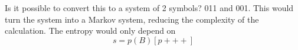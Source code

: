 \documentclass[a4paper, 12pt]{article}
\begin{document}
Is it possible to convert this to a system of 2 symbols? 011 and 001. This would turn the system into a Markov system, reducing the complexity of the calculation. The entropy would only depend on
\begin{equation}
    s = p(B) \left[ p+++ \right]
\end{equation}
\end{document}
